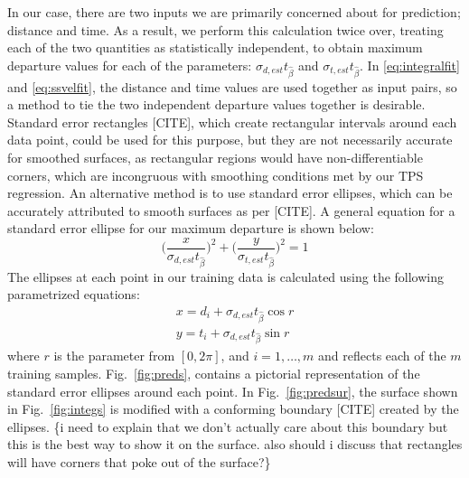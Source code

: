 \documentclass[letterpaper, 10 pt, conference]{ieeeconf}  %
\begin{document}
In our case, there are two inputs we are primarily concerned about for prediction; distance and time. As a result, we perform this calculation twice over, treating each of the two quantities as statistically independent, to obtain maximum departure values for each of the parameters: $\sigma_{d,est}t_{\hat{\beta}}$ and $\sigma_{t,est}t_{\hat{\beta}}$. In \eqref{eq:integralfit} and \eqref{eq:ssvelfit}, the distance and time values are used together as input pairs, so a method to tie the two independent departure values together is desirable. Standard error rectangles [CITE], which create rectangular intervals around each data point, could be used for this purpose, but they are not necessarily accurate for smoothed surfaces, as rectangular regions would have non-differentiable corners, which are incongruous with smoothing conditions met by our TPS regression. An alternative method is to use standard error ellipses, which can be accurately attributed to smooth surfaces as per [CITE]. A general equation for a standard error ellipse for our maximum departure is shown below:
\begin{equation}
    \bigg(\frac{x}{\sigma_{d,est}t_{\hat{\beta}}}\bigg)^2 + \bigg(\frac{y}{\sigma_{t,est}t_{\hat{\beta}}}\bigg)^2 = 1
\end{equation}
The ellipses at each point in our training data is calculated using the following parametrized equations:
\begin{align}
    x = d_i + {\sigma_{d,est}t_{\hat{\beta}}}\cos{r} \nonumber \\
    y = t_i + {\sigma_{d,est}t_{\hat{\beta}}}\sin{r} 
\end{align}
where $r$ is the parameter from $[0,2\pi]$, and $i = 1,\ldots,m$ and reflects each of the $m$ training samples. Fig.~\ref{fig:preds}, contains a pictorial representation of the standard error ellipses around each point. In Fig.~\ref{fig:predsur}, the surface shown in Fig.~\ref{fig:integs} is modified with a conforming boundary [CITE] created by the ellipses. \{i need to explain that we don't actually care about this boundary but this is the best way to show it on the surface. also should i discuss that rectangles will have corners that poke out of the surface?\}
\end{document}
